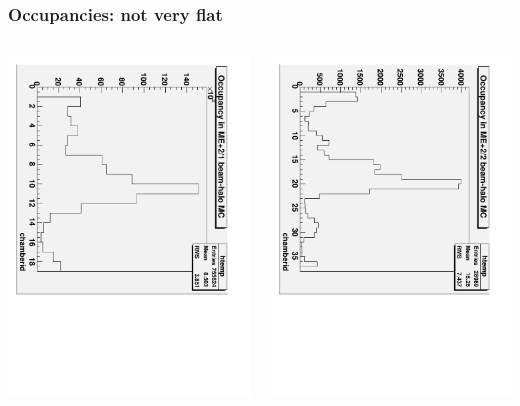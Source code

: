 \documentclass[compress]{beamer}
\begin{document}
\begin{frame}
\frametitle{Occupancies: not very flat}

\begin{columns}
\includegraphics[height=\linewidth, angle=90]{MC_occupancy_ME21.pdf}

\includegraphics[height=\linewidth, angle=90]{MC_occupancy_ME22.pdf}


\end{columns}
\end{frame}
\end{document}
